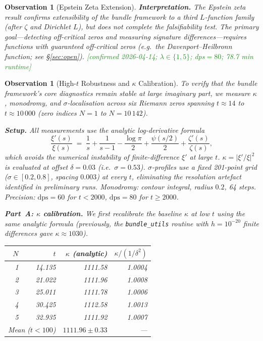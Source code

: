 \documentclass[11pt, a4paper]{article}
\theoremstyle{definition}
\theoremstyle{plain}
\newtheorem{observation}[theorem]{Observation}
\begin{document}
\begin{observation}[Epstein Zeta Extension]
\noindent
\textbf{Interpretation.}\;
The Epstein zeta result confirms extensibility of the bundle framework
to a third $L$-function family (after $\zeta$ and Dirichlet $L$),
but does \emph{not} complete the falsifiability test.  The primary
goal---detecting off-critical zeros and measuring signature
differences---requires functions with \emph{guaranteed} off-critical
zeros (e.g.\ the Davenport--Heilbronn function; see \S\ref{sec:open}).
\textcolor{ForestGreen}{[confirmed 2026-04-14; $\lambda\in\{1,5\}$;
dps${}=80$; 78.7 min runtime]}
\end{observation}


\begin{observation}[High-$t$ Robustness and $\kappa$ Calibration]
\label{obs:high_t_robustness}
To verify that the bundle framework's core diagnostics remain
stable at large imaginary part, we measure $\kappa$, monodromy,
and $\sigma$-localisation across six Riemann zeros spanning
$t \approx 14$ to $t \approx 10\,000$ (zero indices $N=1$ to $N=10\,142$).

\smallskip\noindent
\textbf{Setup.}\;
All measurements use the analytic log-derivative formula
\[
  \frac{\xi'(s)}{\xi(s)}
  \;=\;
  \frac{1}{s} + \frac{1}{s-1}
  - \frac{\log\pi}{2}
  + \frac{\psi(s/2)}{2}
  + \frac{\zeta'(s)}{\zeta(s)},
\]
which avoids the numerical instability of finite-difference
$\xi'$ at large $t$.
$\kappa = |\xi'/\xi|^2$ is evaluated at offset $\delta=0.03$
(i.e.\ $\sigma=0.53$).
$\sigma$-profiles use a \emph{fixed} 201-point grid
($\sigma\in[0.2,0.8]$, spacing $0.003$) at every $t$,
eliminating the resolution artefact identified in preliminary runs.
Monodromy: contour integral, radius $0.2$, 64 steps.
Precision: $\mathrm{dps}=60$ for $t<2000$, $\mathrm{dps}=80$ for
$t\ge 2000$.

\smallskip\noindent
\textbf{Part~A: $\kappa$ calibration.}\;
We first recalibrate the baseline $\kappa$ at low $t$
using the same analytic formula (previously, the
\texttt{bundle\_utils} routine with $h=10^{-20}$ finite
differences gave $\kappa\approx 1030$).

\begin{center}
\small
\begin{tabular}{@{} r r r r @{}}
\toprule
$N$ & $t$ & $\kappa$ (analytic) & $\kappa/(1/\delta^2)$ \\
\midrule
1   & 14.135  & 1111.58 & 1.0004 \\
2   & 21.022  & 1111.96 & 1.0008 \\
3   & 25.011  & 1111.78 & 1.0006 \\
4   & 30.425  & 1112.58 & 1.0013 \\
5   & 32.935  & 1111.92 & 1.0007 \\
\midrule
\multicolumn{2}{l}{Mean ($t<100$)} & $1111.96 \pm 0.33$ & --- \\
\bottomrule
\end{tabular}
\end{center}


\end{observation}
\end{document}
